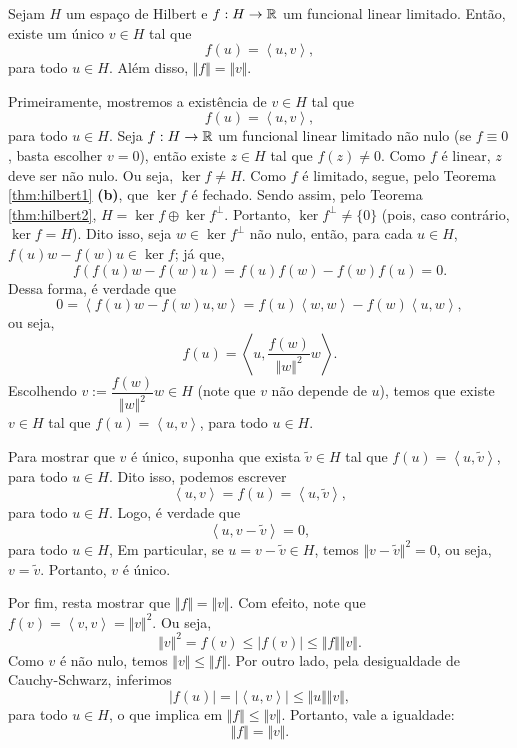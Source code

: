 \begin{tbox} \label{thm:representacao-riesz}
    Sejam $H$ um espaço de Hilbert e $f : H \to \mathbb{R}$ um funcional linear limitado.
    Então, existe um único $v \in H$ tal que
    \[
        f(u) = \left\langle u, v\right\rangle,
    \]
    para todo $u \in H$.
    Além disso, $\Vert f \Vert = \Vert v \Vert$.
\end{tbox}
\begin{prf}
    Primeiramente, mostremos a existência de $v \in H$ tal que
    \[
        f(u) = \left\langle u,v \right\rangle,
    \]
    para todo $u \in H$.
    Seja $f : H \to \mathbb{R}$ um funcional linear limitado não nulo (se $f \equiv 0$, basta escolher $v = 0$), então existe $z \in H$ tal que $f(z) \neq 0$. 
    Como $f$ é linear, $z$ deve ser não nulo. Ou seja, $\ker f \neq H$.
    Como $f$ é limitado, segue, pelo Teorema \ref{thm:hilbert1} \textbf{(b)}, que $\ker f$ é fechado. Sendo assim, pelo Teorema \ref{thm:hilbert2}, $H = \ker f \oplus \ker f ^\perp$.
    Portanto, $\ker f ^\perp \neq \{0\}$ (pois, caso contrário, $\ker f = H$).
    Dito isso, seja $w \in \ker f ^\perp$ não nulo, então, para cada $u \in H$, $f(u) w - f(w)u \in \ker f$; já que,
    \[
        f(f(u)w - f(w)u) = f(u) f(w) - f(w)f(u) = 0.
    \]
    Dessa forma, é verdade que
    \[
        0 = \left\langle f(u)w - f(w)u, w \right\rangle = f(u) \left\langle w,w \right\rangle - f(w) \left\langle u,w \right\rangle,
    \]
    ou seja,
    \[
        f(u) = \left\langle u, \frac{f(w)}{\Vert w \Vert^2}w \right\rangle.
    \]
    Escolhendo $v := \dfrac{f(w)}{\Vert w \Vert^2} w \in H$ (note que $v$ não depende de $u$), temos que existe $v \in H$ tal que $f(u) = \left\langle u,v \right\rangle$, para todo $u \in H$.

    Para mostrar que $v$ é único, suponha que exista $\tilde v \in H$ tal que $f(u) = \left\langle u, \tilde v \right\rangle$, para todo $u \in H$.
    Dito isso, podemos escrever
    \[
        \left\langle u, v \right\rangle = f(u) = \left\langle u,\tilde v \right\rangle,
    \] 
    para todo $u \in H$. Logo, é verdade que
    \[
        \left\langle u , v - \tilde v \right\rangle = 0,
    \]
    para todo $u \in H$, Em particular, se $u = v - \tilde v \in H$, temos $\Vert v - \tilde v \Vert^2 = 0$, ou seja, $v = \tilde v$. Portanto, $v$ é único.

    Por fim, resta mostrar que $\Vert f \Vert = \Vert v \Vert$.
    Com efeito, note que $f(v) = \left\langle v, v \right\rangle = \Vert v \Vert^2$. Ou seja,
    \[
        \Vert v \Vert^2 = f(v) \leqslant |f(v)| \leqslant \Vert f \Vert \Vert v \Vert.
    \]
    Como $v$ é não nulo, temos $\Vert v \Vert \leqslant \Vert f \Vert$.
    Por outro lado, pela desigualdade de Cauchy-Schwarz, inferimos
    \[
        |f(u)| = |\left\langle u,v \right\rangle| \leqslant \Vert u \Vert \Vert v \Vert,
    \]
    para todo $u \in H$,
    o que implica em $\Vert f \Vert \leqslant \Vert v \Vert$.
    Portanto, vale a igualdade:
    \[
        \Vert f \Vert = \Vert v \Vert.
    \]
\end{prf}

